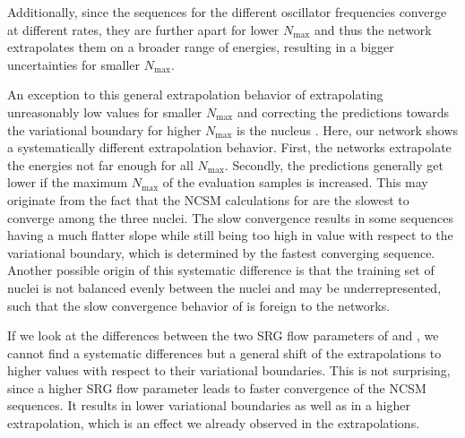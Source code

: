 Additionally, since the sequences for the different oscillator frequencies converge at different rates, they are further apart for lower $N_\mathrm{max}$ and thus the network extrapolates them on a broader range of energies, resulting in a bigger uncertainties for smaller $N_\mathrm{max}$.

An exception to this general extrapolation behavior of extrapolating unreasonably low values for smaller $N_\mathrm{max}$ and correcting the predictions towards the variational boundary for higher $N_\mathrm{max}$ is the nucleus . Here, our network shows a systematically different extrapolation behavior. First, the networks extrapolate the energies not far enough for all $N_\mathrm{max}$. Secondly, the predictions generally get lower if the maximum $N_\mathrm{max}$ of the evaluation samples is increased. This may originate from the fact that the NCSM calculations for  are the slowest to converge among the three nuclei. The slow convergence results in some sequences having a much flatter slope while still being too high in value with respect to the variational boundary, which is determined by the fastest converging sequence. Another possible origin of this systematic difference is that the training set of nuclei is not balanced evenly between the nuclei and  may be underrepresented, such that the slow convergence behavior of  is foreign to the networks.

If we look at the differences between the two SRG flow parameters of  and , we cannot find a systematic differences but a general shift of the extrapolations to higher values with respect to their variational boundaries. This is not surprising, since a higher SRG flow parameter leads to faster convergence of the NCSM sequences. It results in lower variational boundaries as well as in a higher extrapolation, which is an effect we already observed in the  extrapolations.
